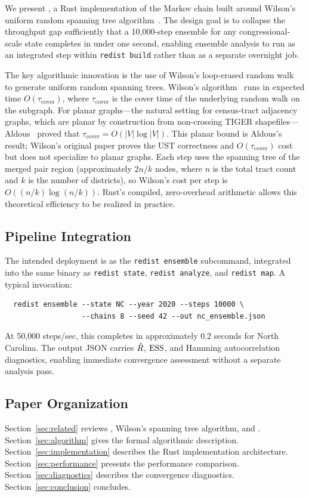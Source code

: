 We present \re{}, a Rust implementation of the \recom{} Markov chain
built around Wilson's uniform random spanning tree
algorithm~\citep{wilson1996generating}.
The design goal is to collapse the throughput gap sufficiently that
a 10{,}000-step ensemble for any congressional-scale state completes in
under one second, enabling ensemble analysis to run as an integrated step
within \texttt{redist build} rather than as a separate overnight job.

The key algorithmic innovation is the use of Wilson's loop-erased random
walk~\citep{lawler1980loop} to generate uniform random spanning trees.
Wilson's algorithm~\citep{wilson1996generating} runs in expected time
$O(\tau_{\mathrm{cover}})$, where $\tau_{\mathrm{cover}}$ is the
cover time of the underlying random walk on the subgraph.
For planar graphs---the natural setting for census-tract adjacency
graphs, which are planar by construction from non-crossing TIGER
shapefiles---Aldous~\citeyearpar{aldous1991random} proved that
$\tau_{\mathrm{cover}} = O(|V|\log|V|)$.
This planar bound is Aldous's result; Wilson's original paper proves the
UST correctness and $O(\tau_{\mathrm{cover}})$ cost but does not specialize
to planar graphs.
Each \recom{} step uses the spanning tree of the merged pair region
(approximately $2n/k$ nodes, where $n$ is the total tract count and $k$
is the number of districts), so Wilson's cost per step is
$O((n/k)\log(n/k))$.
Rust's compiled, zero-overhead arithmetic allows this theoretical
efficiency to be realized in practice.

\subsection{Pipeline Integration}

The intended deployment is as the \texttt{redist ensemble} subcommand,
integrated into the same binary as \texttt{redist state},
\texttt{redist analyze}, and \texttt{redist map}.
A typical invocation:

\begin{verbatim}
  redist ensemble --state NC --year 2020 --steps 10000 \
                  --chains 8 --seed 42 --out nc_ensemble.json
\end{verbatim}

At 50{,}000 steps/sec, this completes in approximately 0.2 seconds for
North Carolina.
The output JSON carries $\hat{R}$, $\mathrm{ESS}$, and Hamming autocorrelation
diagnostics, enabling immediate convergence assessment without a separate
analysis pass.

\subsection{Paper Organization}

Section~\ref{sec:related} reviews \recom{}, Wilson's spanning tree
algorithm, and \gc{}.
Section~\ref{sec:algorithm} gives the formal algorithmic description.
Section~\ref{sec:implementation} describes the Rust implementation
architecture.
Section~\ref{sec:performance} presents the performance comparison.
Section~\ref{sec:diagnostics} describes the convergence diagnostics.
Section~\ref{sec:conclusion} concludes.
